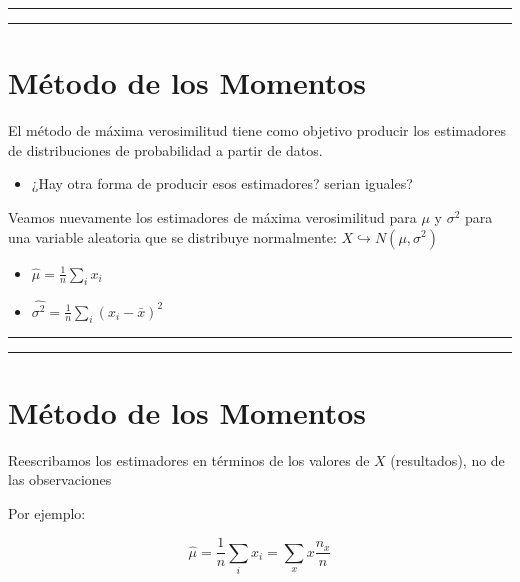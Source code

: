 \documentclass[
]{book}
\providecommand{\tightlist}{%
  \setlength{\itemsep}{0pt}\setlength{\parskip}{0pt}}
\begin{document}
\begin{center}\rule{0.5\linewidth}{0.5pt}\end{center}

\begin{center}\rule{0.5\linewidth}{0.5pt}\end{center}

\hypertarget{muxe9todo-de-los-momentos}{%
\section{Método de los Momentos}\label{muxe9todo-de-los-momentos}}

El método de máxima verosimilitud tiene como objetivo producir los estimadores de distribuciones de probabilidad a partir de datos.

\begin{itemize}
\tightlist
\item
  ¿Hay otra forma de producir esos estimadores? serian iguales?
\end{itemize}

Veamos nuevamente los estimadores de máxima verosimilitud para \(\mu\) y \(\sigma^2\) para una variable aleatoria que se distribuye normalmente: \(X \hookrightarrow N(\mu, \sigma^2)\)

\begin{itemize}
\tightlist
\item
  \(\hat{\mu}=\frac{1}{n}\sum_i x_i\)
\item
  \(\hat{\sigma^2}=\frac{1}{n}\sum_i(x_i-\bar{x})^2\)
\end{itemize}

\begin{center}\rule{0.5\linewidth}{0.5pt}\end{center}

\begin{center}\rule{0.5\linewidth}{0.5pt}\end{center}

\hypertarget{muxe9todo-de-los-momentos-1}{%
\section{Método de los Momentos}\label{muxe9todo-de-los-momentos-1}}

Reescribamos los estimadores en términos de los valores de \(X\) (resultados), no de las observaciones

Por ejemplo:

\[\hat{\mu}=\frac{1}{n}\sum_i x_i= \sum_x x \frac{n_x}{n}\]
\end{document}
